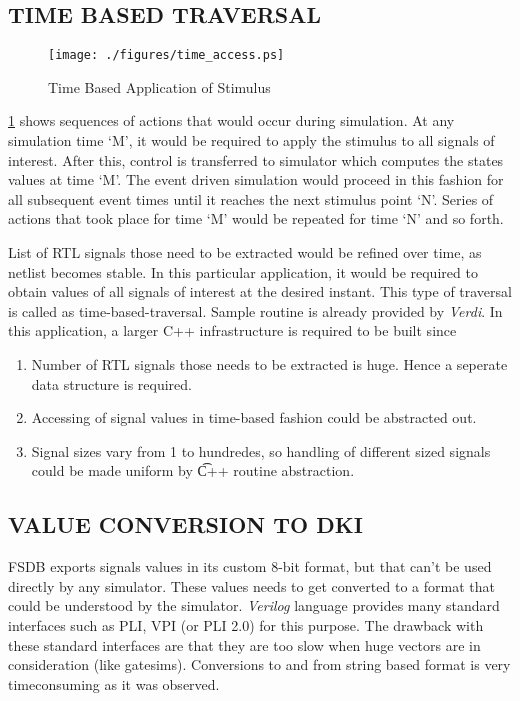 \subsection{TIME BASED TRAVERSAL}
\begin{figure}[h]
\centering
\texttt{[image: ./figures/time\_access.ps]}
\caption{Time Based Application of Stimulus}
\label{fig:dualsim:tbas}
\end{figure}

\figurename{\ref{fig:dualsim:tbas}} shows sequences of actions that would occur during simulation. At any simulation time `M', it would be required to apply the stimulus to all signals of interest. After  this, control is transferred to simulator which computes  the states values at time `M'. The event driven simulation  would proceed in this fashion for all subsequent event times until it reaches the next stimulus point `N'. Series of actions that took place for time `M' would be repeated for time `N'  and so forth.

List of RTL signals those need to be extracted would be refined over time, as netlist becomes stable. In this particular application, it would  be required  to obtain values of all signals of interest at the desired  instant. This type of traversal is called as time-based-traversal. Sample routine \cite[p.~28]{Verdi:FsdbReader} is already provided by {\it Verdi}. In this application, a larger C++ infrastructure is required to be built since
\begin{enumerate}
\item Number of RTL signals those needs to be extracted is huge. Hence a seperate data structure is required.
\item Accessing of signal values in time-based fashion could be abstracted out.
\item Signal sizes vary from 1 to hundredes, so handling of different sized signals could be made uniform by {\t C++} routine abstraction.
\end{enumerate}


\subsection{VALUE CONVERSION TO DKI}
FSDB exports signals values in its custom 8-bit format, but that can't be used directly by any simulator. These values needs to get converted to a format that could be understood by the simulator. {\it Verilog} language\cite{ieee:v:2005} provides many standard interfaces such as PLI, VPI (or PLI 2.0) for this purpose. The drawback with these standard interfaces are that they are too slow when huge vectors are in consideration (like gatesims). Conversions to and from string based format is very timeconsuming as it was observed.

